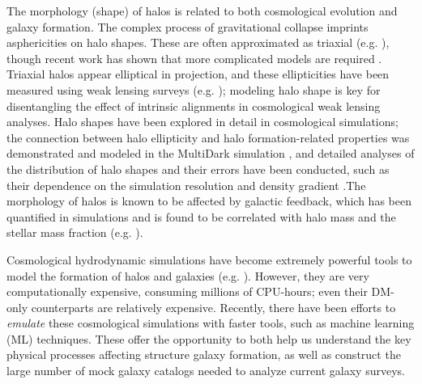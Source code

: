 The morphology (shape) of halos is related to both cosmological evolution and galaxy formation.
The complex process of gravitational collapse imprints asphericities on halo shapes.
These are often approximated as triaxial (e.g. \citealt{angrick_triaxial_2010}), though recent work has shown that more complicated models are required \citep{bonnet_morphology_2022}.
Triaxial halos appear elliptical in projection, and these ellipticities have been measured using weak lensing surveys (e.g. \citealt{robison_shape_2022,schrabback_tightening_2021}); modeling halo shape is key for disentangling the effect of intrinsic alignments in cosmological weak lensing analyses.
Halo shapes have been explored in detail in cosmological simulations; the connection between halo ellipticity and halo formation-related properties was demonstrated and modeled in the MultiDark simulation \citep{lau_correlations_2021}, and detailed analyses of the distribution of halo shapes and their errors have been conducted, such as their dependence on the simulation resolution \citep{schneider_shapes_2012} and density gradient \citep{fischer_sensitivity_2023}.The morphology of halos is known to be affected by galactic feedback, which has been quantified in simulations and is found to be correlated with halo mass and the stellar mass fraction (e.g. \citealt{chua_impact_2022}).

Cosmological hydrodynamic simulations have become extremely powerful tools to model the formation of halos and galaxies (e.g. \citealt{springel_gadget_2001, genel_introducing_2014,dave_simba_2019}).
However, they are very computationally expensive, consuming millions of CPU-hours; even their DM-only counterparts are relatively expensive.
Recently, there have been efforts to \emph{emulate} these cosmological simulations with faster tools, such as machine learning (ML) techniques.
These offer the opportunity to both help us understand the key physical processes affecting structure galaxy formation, as well as construct the large number of mock galaxy catalogs needed to analyze current galaxy surveys. 


